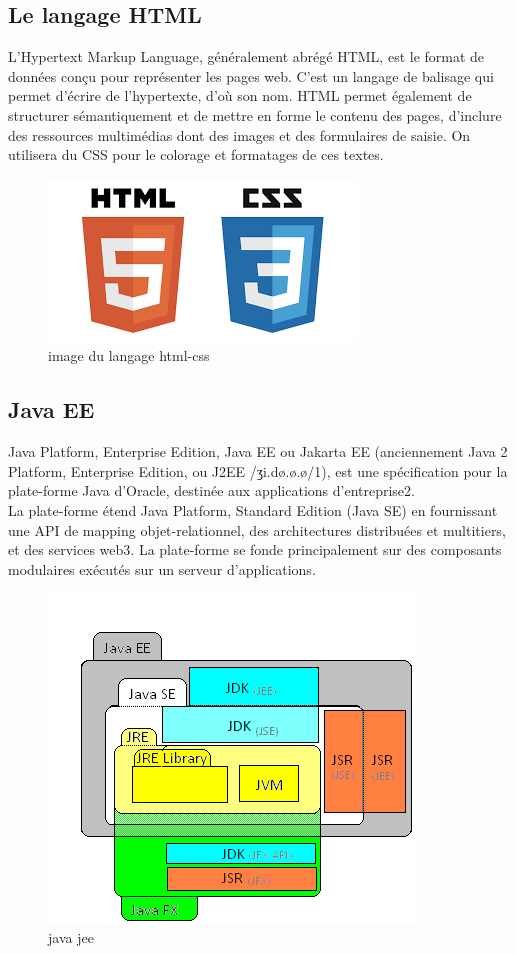 \documentclass[oneside,12pt,a4paper]{book}
\begin{document}
\subsection{Le langage HTML}
L’Hypertext Markup Language, généralement abrégé HTML, est le format de données conçu pour représenter les pages web. C’est un langage de balisage qui permet d’écrire de l’hypertexte, d’où son nom. HTML permet également de structurer sémantiquement et de mettre en forme le contenu des pages, d’inclure
des ressources multimédias dont des images et des formulaires de saisie.
On utilisera du CSS pour le colorage et formatages de ces textes.
\begin{figure}[ht]
\centering\includegraphics[width=0.7\linewidth]{html.png}
\caption{image du langage html-css}
\end{figure}

\subsection{Java EE}
Java Platform, Enterprise Edition, Java EE ou Jakarta EE (anciennement Java 2 Platform, Enterprise Edition, ou J2EE /ʒi.dø.ø.ø/1), est une spécification pour la plate-forme Java d'Oracle, destinée aux applications d'entreprise2.\\
La plate-forme étend Java Platform, Standard Edition (Java SE) en fournissant une API de mapping objet-relationnel, des architectures distribuées et multitiers, et des services web3. La plate-forme se fonde principalement sur des composants modulaires exécutés sur un serveur d'applications.
\begin{figure}[ht]
\centering\includegraphics[width=0.7\linewidth]{Java_jee.png}
\caption{java jee }
\end{figure}
\end{document}
